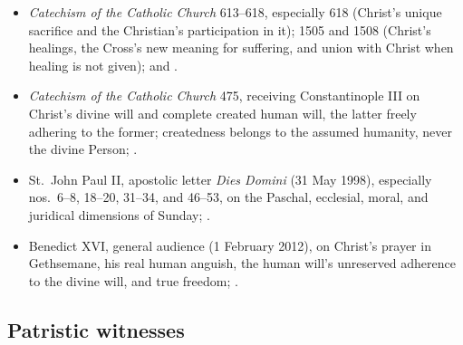 {\begin{itemize}[itemsep=0pt,parsep=0pt,topsep=0.05em]
\item \emph{Catechism of the Catholic Church} 613--618, especially 618 (Christ's unique sacrifice and the Christian's participation in it); 1505 and 1508 (Christ's healings, the Cross's new meaning for suffering, and union with Christ when healing is not given);  and .
\item \emph{Catechism of the Catholic Church} 475, receiving Constantinople III on Christ's divine will and complete created human will, the latter freely adhering to the former; createdness belongs to the assumed humanity, never the divine Person; .
\item St.~John Paul II, apostolic letter \emph{Dies Domini} (31 May 1998), especially nos.~6--8, 18--20, 31--34, and 46--53, on the Paschal, ecclesial, moral, and juridical dimensions of Sunday; .
\item Benedict XVI, general audience (1 February 2012), on Christ's prayer in Gethsemane, his real human anguish, the human will's unreserved adherence to the divine will, and true freedom; .
\end{itemize}}

\subsection*{Patristic witnesses}

